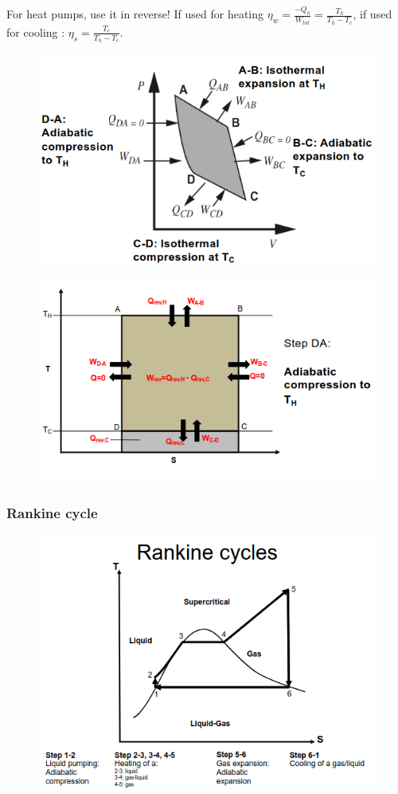 \documentclass[../main.tex]{subfiles}
\begin{document}
For heat pumps, use it in reverse! If used for heating $\eta_w = \frac{-Q_h}{W_{tot}} = \frac{T_h}{T_h-T_c}$, if used for cooling : $\eta_s = \frac{T_c}{T_h-T_c}$.\\

\begin{figure}[hbt!]
    \centering
    \includegraphics[width=0.5\linewidth]{IMAGES/Renewable/Screenshot from 2025-02-25 15-51-57.png}
\end{figure}
\begin{figure}[hbt!]
    \centering
    \includegraphics[width=0.5\linewidth]{IMAGES/Renewable/Screenshot from 2025-02-25 15-52-04.png}
\end{figure}

\subsubsection{Rankine cycle}

\begin{figure}[hbt!]
    \centering
    \includegraphics[width=0.5\linewidth]{IMAGES/Renewable/Screenshot from 2025-02-25 16-30-37.png}
\end{figure}
\end{document}
